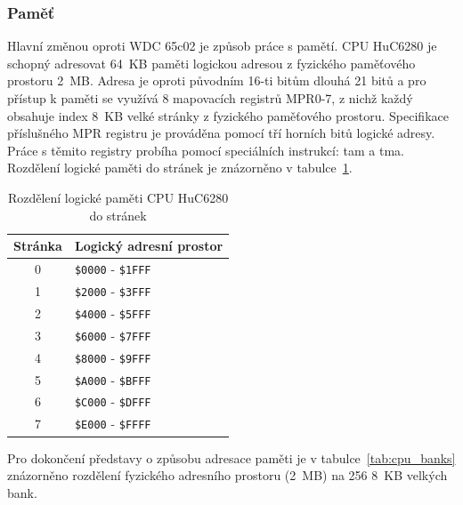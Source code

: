 
\subsubsection{Paměť}\label{chap:spec_hw_cpu_memory}

Hlavní změnou oproti WDC 65c02 je způsob práce s pamětí. CPU HuC6280 je schopný
adresovat 64~KB paměti logickou adresou z fyzického paměťového prostoru 2~MB.
Adresa je oproti původním 16-ti bitům dlouhá 21 bitů a pro přístup k paměti se
využívá 8 mapovacích registrů {\sf MPR0-7}, z nichž každý obsahuje index 8~KB
velké stránky z fyzického paměťového prostoru. Specifikace příslušného {\sf
MPR} registru je prováděna pomocí tří horních bitů logické adresy. Práce s
těmito registry probíha pomocí speciálních instrukcí: {\sc tam} a {\sc tma}.
Rozdělení logické paměti do stránek je znázorněno v tabulce~\ref{tab:cpu_mem}.

\begin{table}[hb]
\begin{center}
\begin{tabular}{|c|l|}
\hline
\textbf{Stránka} & \textbf{Logický adresní prostor} \\
\hline
0 & {\tt \$0000} - {\tt \$1FFF}\\
1 & {\tt \$2000} - {\tt \$3FFF}\\
2 & {\tt \$4000} - {\tt \$5FFF}\\
3 & {\tt \$6000} - {\tt \$7FFF}\\
4 & {\tt \$8000} - {\tt \$9FFF}\\
5 & {\tt \$A000} - {\tt \$BFFF}\\
6 & {\tt \$C000} - {\tt \$DFFF}\\
7 & {\tt \$E000} - {\tt \$FFFF}\\
\hline
\end{tabular}
\end{center}
\caption{Rozdělení logické paměti CPU HuC6280 do stránek\label{tab:cpu_mem}}
\end{table}

Pro dokončení představy o způsobu adresace paměti je v
tabulce~\ref{tab:cpu_banks} znázorněno rozdělení fyzického adresního
prostoru (2~MB) na 256 8~KB velkých bank.

